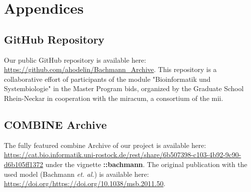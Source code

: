 \section*{Appendices}

\subsection*{GitHub Repository} \label{git}

Our public GitHub repository is available here: \url{https://github.com/ahodelin/Bachmann_Archive}.
This repository is a collaborative effort of participants of the module "Bioinformatik und Systembiologie" in the Master Program \ac{bids}, organized by the Graduate School Rhein-Neckar in cooperation with the \ac{miracum}, a consortium of the \ac{mii}.

\subsection*{COMBINE Archive}

The fully featured \ac{combine} Archive of our project is available here: \url{https://cat.bio.informatik.uni-rostock.de/rest/share/6b507398-c103-4b92-9c90-d6b105ff1372} under the vignette  \textbf{::bachmann}. The original publication with the used model (Bachmann \textit{et. al.}) is available here: \url{https://doi.org/https://doi.org/10.1038/msb.2011.50}.